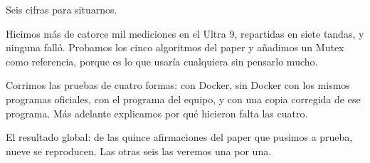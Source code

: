 Seis cifras para situarnos.

Hicimos más de catorce mil mediciones en el Ultra 9, repartidas en siete tandas, y ninguna falló. Probamos los cinco algoritmos del paper y añadimos un Mutex como referencia, porque es lo que usaría cualquiera sin pensarlo mucho.

Corrimos las pruebas de cuatro formas: con Docker, sin Docker con los mismos programas oficiales, con el programa del equipo, y con una copia corregida de ese programa. Más adelante explicamos por qué hicieron falta las cuatro.

El resultado global: de las quince afirmaciones del paper que pusimos a prueba, nueve se reproducen. Las otras seis las veremos una por una.
